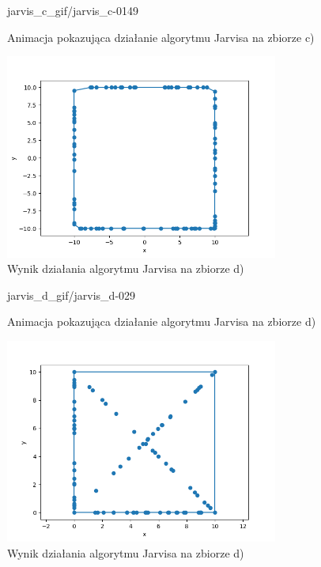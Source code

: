 \documentclass[a4paper]{article}
\begin{document}
\begin{figure}[H]
    {jarvis_c_gif/jarvis_c-}{0}{149}
    \centering
    \caption{Animacja pokazująca działanie algorytmu Jarvisa na zbiorze c)}
    \label{fig:anim_jarvis_c}
\end{figure}

\begin{figure}[H]
    \centering
    \includegraphics[width=0.8\textwidth]{jarvis/jarvis_c_png.png}
    \caption{Wynik działania algorytmu Jarvisa na zbiorze d)}
    \label{fig:jarvis_c}
\end{figure}

\begin{figure}[H]
    {jarvis_d_gif/jarvis_d-}{0}{29}
    \centering
    \caption{Animacja pokazująca działanie algorytmu Jarvisa na zbiorze d)}
    \label{fig:anim_jarvis_d}
\end{figure}

\begin{figure}[H]
    \centering
    \includegraphics[width=0.8\textwidth]{jarvis/jarvis_d_png.png}
    \caption{Wynik działania algorytmu Jarvisa na zbiorze d)}
    \label{fig:jarvis_d}
\end{figure}
\end{document}
